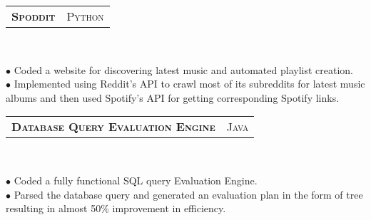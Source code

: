 \documentclass[10pt,a4paper,oneside]{article}
\begin{document}
    \vspace{-6pt}
    \begin{tabular}{c|c}
        \textbf{\normalsize S\textsc{poddit}}
        &\textmd{\normalsize P\textsc{ython}}
    \end{tabular}\\
     \vspace{-4mm}
    \begin{adjustwidth}{7pt}{0pt}
        {\footnotesize $\bullet$ Coded a website for discovering latest music and automated playlist creation.\\ 
        $\bullet$ Implemented using Reddit's API to crawl most of its subreddits for latest music albums and then used Spotify's API for getting corresponding Spotify links.}\\
    \end{adjustwidth}
    \vspace{-6pt}
    \begin{tabular}{c|c}
        \textbf{\normalsize D\textsc{atabase} Q\textsc{uery}
        E\textsc{valuation} E\textsc{ngine}}
        &\textmd{\normalsize J\textsc{ava}}
    \end{tabular}\\
     \vspace{-4mm}
    \begin{adjustwidth}{7pt}{0pt}
        {\footnotesize $\bullet$ Coded a fully functional SQL query Evaluation Engine.\\
        $\bullet$ Parsed the database query and generated an evaluation plan in the form of tree resulting in almost 50\% improvement in efficiency.}\\
    \end{adjustwidth}
    \begin{comment}
        \vspace{-6pt}
        \begin{tabular}{c|c}
            \textbf{\normalsize S\textsc{impella}}
            &\textmd{\normalsize J\textsc{ava}}
        \end{tabular}\\
         \vspace{-4mm}
        \begin{adjustwidth}{7pt}{0pt}
            {\footnotesize $\bullet$ Implemented a simplified version of the
            Gnutella Protocol Version 0.6, A chatting and file transfer
            system.\\
            $\bullet$ Analyzed important networking concepts like routing tables, table lookup, controlled
            flooding, protocol, packet formatting and distributive
            collaboration.\\
            $\bullet$ Included multitasking capabilities like simultaneous
            downloads and monitoring.}\\
        \end{adjustwidth}
    \end{comment}
\end{document}
